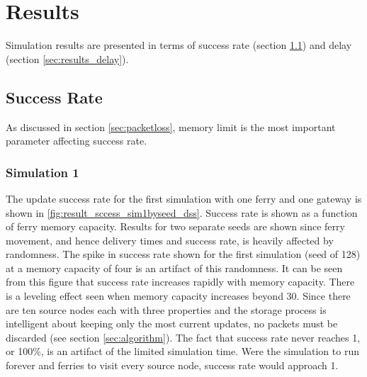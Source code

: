 \chapter{Results}

Simulation results are presented in terms of success rate (section \ref{sec:results_success_rate}) and delay (section \ref{sec:results_delay}).

\section{Success Rate}
\label{sec:results_success_rate}

As discussed in section \ref{sec:packetloss}, memory limit is the most important parameter affecting success rate. 

\subsection{Simulation 1}
\label{sec:results_success_scenario1}

The update success rate for the first simulation with one ferry and one gateway is shown in \ref{fig:result_sccess_sim1byseed_dss}.
Success rate is shown as a function of ferry memory capacity. 
Results for two separate seeds are shown since ferry movement, and hence delivery times and success rate, is heavily affected by randomness.
The spike in success rate shown for the first simulation (seed of 128) at a memory capacity of four is an artifact of this randomness.
It can be seen from this figure that success rate increases rapidly with memory capacity.
There is a leveling effect seen when memory capacity increases beyond 30.
Since there are ten source nodes each with three properties and the storage process is intelligent about keeping only the most current updates, no packets must be discarded (see section \ref{sec:algorithm}).
The fact that success rate never reaches 1, or 100\%, is an artifact of the limited simulation time.
Were the simulation to run forever and ferries to visit every source node, success rate would approach 1.

